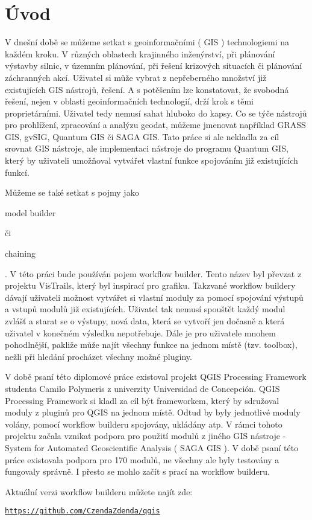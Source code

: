 \chapter*{Úvod}

V dnešní době se můžeme setkat s  geoinformačními ( GIS ) technologiemi na každém kroku. V různých oblastech krajinného inženýrství, při plánování výstavby silnic, v územním plánování, při řešení krizových situacích či plánování záchranných akcí. Uživatel si může vybrat z nepřeberného množství již existujících GIS nástrojů, řešení. A s potěšením lze konstatovat, že svobodná řešení, nejen v oblasti geoinformačních technologií, drží krok s těmi proprietárními. Uživatel tedy nemusí sahat hluboko do kapsy. Co se týče nástrojů pro prohlížení, zpracování a analýzu  geodat, můžeme jmenovat například GRASS GIS, gvSIG, Quantum GIS či SAGA GIS. Tato práce si ale nekladla za cíl srovnat GIS nástroje, ale implementaci nástroje do programu Quantum GIS, který by uživateli umožňoval vytvářet vlastní funkce spojováním již existujících funkcí.

Můžeme se také setkat s pojmy jako \begin{scriptsize}model builder\end{scriptsize} či \begin{scriptsize}chaining\end{scriptsize}. V této práci bude používán pojem workflow builder. Tento název byl převzat z projektu  VisTrails, který byl inspirací pro grafiku. Takzvané workflow buildery dávají uživateli možnost vytvářet si vlastní moduly za pomocí spojování výstupů a vstupů modulů již existujících. Uživatel tak nemusí spouštět každý modul zvlášť a starat se o výstupy, nová data, která se vytvoří jen dočasně a která uživatel v konečném výsledku nepotřebuje. Dále je pro uživatele mnohem pohodlnější, pakliže může najít všechny funkce na jednom místě (tzv. toolbox), nežli při hledání procházet všechny možné pluginy.

V době psaní této diplomové práce existoval projekt  QGIS Processing Framework studenta Camilo Polymeris z univerzity Universidad de Concepción. QGIS Processing Framework si kladl za cíl být frameworkem, který by sdružoval moduly z pluginů pro QGIS na jednom místě. Odtud by byly jednotlivé moduly volány, pomocí workflow builderu spojovány, ukládány atp. V rámci tohoto projektu začala vznikat podpora pro použití modulů z jiného GIS nástroje - System for Automated Geoscientific Analysis ( SAGA GIS ). V době psaní této práce existovala podpora pro 170 modulů, ne všechny ale byly testovány a fungovaly správně. I přesto se mohlo začít s prací na workflow builderu.

Aktuální verzi workflow builderu můžete najít zde:

\begin{center}
	\href{https://github.com/CzendaZdenda/qgis}{\texttt{https://github.com/CzendaZdenda/qgis}}
\end{center}
